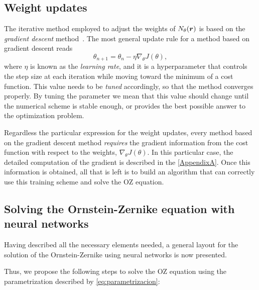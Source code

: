 \subsection{Weight updates}
The iterative method employed to adjust the weights of $N_{\theta}(\bm{r})$ is based on the
\emph{gradient descent} method~\cite{nocedalNumericalOptimization2006}.
The most general update rule for a method based on gradient descent reads~\cite{goodfellowDeepLearning2016}
\begin{equation}
    \theta_{n+1} = \theta_n - \eta \nabla_{\theta} J(\theta) ,
    \label{eq:gradiente}
\end{equation}
where $\eta$ is known as the \emph{learning rate}, and it is a hyperparameter
that controls the step size at each iteration while moving toward the minimum
of a cost function. This value needs to be \emph{tuned} accordingly, so
that the method converges properly. By tuning the parameter we mean that this value
should change until the numerical scheme is stable enough, or provides the best
possible answer to the optimization problem.

Regardless the particular expression for the weight updates, every method
based on the gradient descent method \emph{requires} the gradient information from
the cost function with respect to the weights, $\nabla_{\theta} J(\theta)$.
In this particular case, the detailed computation of the gradient is described in
the \autoref{AppendixA}.
Once this information is obtained, all that is left is to build an algorithm that
can correctly use this training scheme and solve the OZ equation.

\subsection{Solving the Ornstein-Zernike equation with neural networks}
\label{subsec:oz-solution}

Having described all the necessary elements needed, a general layout for the solution
of the Ornstein-Zernike using neural networks is now presented.

Thus, we propose the following steps to solve the OZ equation using the parametrization
described by \autoref{eq:parametrizacion}:

